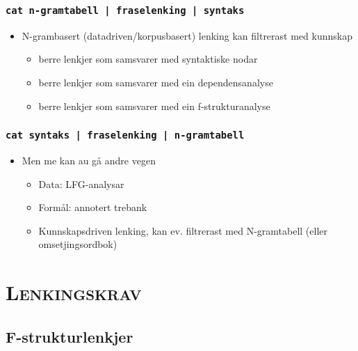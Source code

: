 \documentclass[xcolor=x11names,compress,bigger]{beamer}
\renewcommand{\(}{\begin{columns}}
\renewcommand{\)}{\end{columns}}
\newcommand{\<}[1]{\begin{column}{#1}}
\renewcommand{\>}{\end{column}}
\begin{document}
\begin{frame}\frametitle{\texttt{\normalsize cat n-gramtabell | fraselenking | syntaks}}
    \begin{itemize}
    \item N-grambasert (datadriven/korpusbasert) lenking kan filtrerast med kunnskap
      \begin{itemize}
       \item berre lenkjer som samsvarer med syntaktiske nodar \citep{samuelsson2007apa}
       \item berre lenkjer som samsvarer med ein dependensanalyse \citep{hearne2008ccd}
       \item berre lenkjer som samsvarer med ein f-strukturanalyse \citep{graham2009osr}
      \end{itemize}
    \end{itemize}
  \end{frame}

\begin{frame}\frametitle{\texttt{\normalsize cat syntaks | fraselenking | n-gramtabell}}
  \begin{itemize}
  \item Men me kan au gå andre vegen
    \begin{itemize}
    \item Data: LFG-analysar
    \item Formål: annotert trebank
    \item Kunnskapsdriven lenking, kan ev. filtrerast med N-gramtabell
      (eller omsetjingsordbok)
    \end{itemize}
  \end{itemize}
\end{frame}

\section{\scshape Lenkingskrav}
\subsection{F-strukturlenkjer}
\end{document}
